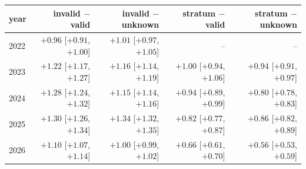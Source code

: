 \begin{tabular}{lrrrr}
\toprule
year & invalid $-$ valid & invalid $-$ unknown & stratum $-$ valid & stratum $-$ unknown \\
\midrule
2022 & $+0.96$ [$+0.91$, $+1.00$] & $+1.01$ [$+0.97$, $+1.05$] & -- & -- \\
2023 & $+1.22$ [$+1.17$, $+1.27$] & $+1.16$ [$+1.14$, $+1.19$] & $+1.00$ [$+0.94$, $+1.06$] & $+0.94$ [$+0.91$, $+0.97$] \\
2024 & $+1.28$ [$+1.24$, $+1.32$] & $+1.15$ [$+1.14$, $+1.16$] & $+0.94$ [$+0.89$, $+0.99$] & $+0.80$ [$+0.78$, $+0.83$] \\
2025 & $+1.30$ [$+1.26$, $+1.34$] & $+1.34$ [$+1.32$, $+1.35$] & $+0.82$ [$+0.77$, $+0.87$] & $+0.86$ [$+0.82$, $+0.89$] \\
2026 & $+1.10$ [$+1.07$, $+1.14$] & $+1.00$ [$+0.99$, $+1.02$] & $+0.66$ [$+0.61$, $+0.70$] & $+0.56$ [$+0.53$, $+0.59$] \\
\bottomrule
\end{tabular}
